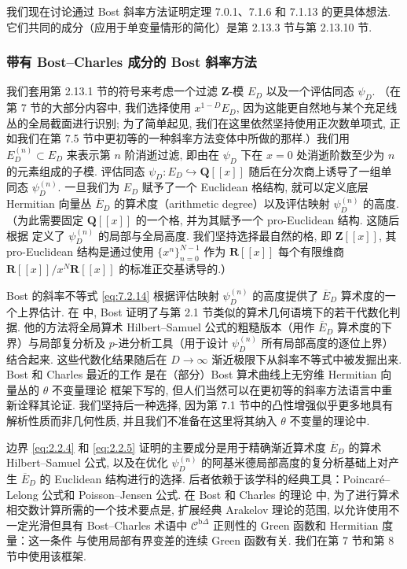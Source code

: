 我们现在讨论通过 Bost 斜率方法证明定理 7.0.1、7.1.6 和 7.1.13 的更具体想法. 它们共同的成分（应用于单变量情形的简化）是第 2.13.3 节与第 2.13.10 节.

\subsubsection{带有 Bost--Charles \cite{BC22} 成分的 Bost 斜率方法}\label{sec:2.13.12}

我们套用第 2.13.1 节的符号来考虑一个过滤 \(\mathbf{Z}\)-模 \(E_D\) 以及一个评估同态 \(\psi_D\). （在第 7 节的大部分内容中, 我们选择使用 \(x^{1-D}E_D\), 因为这能更自然地与某个充足线丛的全局截面进行识别; 为了简单起见, 我们在这里依然坚持使用正次数单项式, 正如我们在第 7.5 节中更初等的一种斜率方法变体中所做的那样.）我们用 \(E_D^{(n)} \subset E_D\) 来表示第 \(n\) 阶消逝过滤, 即由在 \(\psi_D\) 下在 \(x=0\) 处消逝阶数至少为 \(n\) 的元素组成的子模. 评估同态 \(\psi_D: E_D \hookrightarrow \mathbf{Q}[\! [x]\!]\) 随后在分次商上诱导了一组单同态 \(\psi_D^{(n)}\). 一旦我们为 \(E_D\) 赋予了一个 Euclidean 格结构, 就可以定义底层 Hermitian 向量丛 \(\overline{E}_D\) 的算术度（arithmetic degree）以及评估映射 \(\psi_D^{(n)}\) 的高度. （为此需要固定 \(\mathbf{Q}[\! [x]\!]\) 的一个格, 并为其赋予一个 pro-Euclidean 结构. 这随后根据 \cite[§ 1.4.3]{Bos20} 定义了 \(\psi_D^{(n)}\) 的局部与全局高度. 我们坚持选择最自然的格, 即 \(\mathbf{Z}[\! [x]\!]\), 其 pro-Euclidean 结构是通过使用 \(\{x^n\}_{n=0}^{N-1}\) 作为 \(\mathbf{R}[\! [x]\!]\) 每个有限维商 \(\mathbf{R}[\! [x]\!]/x^N\mathbf{R}[\! [x]\!]\) 的标准正交基诱导的.）

Bost 的斜率不等式 \eqref{eq:7.2.14} 根据评估映射 \(\psi_D^{(n)}\) 的高度提供了 \(\overline{E}_D\) 算术度的一个上界估计. 在 \cite{Bos01, Bos04} 中, Bost 证明了与第 2.1 节类似的算术几何语境下的若干代数化判据. 他的方法将全局算术 Hilbert--Samuel 公式的粗糙版本（用作 \(\overline{E}_D\) 算术度的下界）与局部复分析及 \(p\)-进分析工具（用于设计 \(\psi_D^{(n)}\) 所有局部高度的逐位上界）结合起来. 这些代数化结果随后在 \(D \to \infty\) 渐近极限下从斜率不等式中被发掘出来. Bost 和 Charles 最近的工作 \cite{BC22} 是在（部分）Bost 算术曲线上无穷维 Hermitian 向量丛的 \(\theta\) 不变量理论 \cite{Bos20} 框架下写的, 但人们当然可以在更初等的斜率方法语言中重新诠释其论证. 我们坚持后一种选择, 因为第 7.1 节中的凸性增强似乎更多地具有解析性质而非几何性质, 并且我们不准备在这里将其纳入 \(\theta\) 不变量的理论中.

边界 \eqref{eq:2.2.4} 和 \eqref{eq:2.2.5} 证明的主要成分是用于精确渐近算术度 \(\overline{E}_D\) 的算术 Hilbert--Samuel 公式, 以及在优化 \(\psi_D^{(n)}\) 的阿基米德局部高度的复分析基础上对产生 \(\overline{E}_D\) 的 Euclidean 结构进行的选择. 后者依赖于该学科的经典工具：Poincar{\'e}--Lelong 公式和 Poisson--Jensen 公式. 在 Bost 和 Charles 的理论 \cite[§ 4]{BC22} 中, 为了进行算术相交数计算所需的一个技术要点是, 扩展经典 Arakelov 理论的范围, 以允许使用不一定光滑但具有 Bost--Charles 术语中 \(\mathcal{C}^{\mathrm{b}\Delta}\) 正则性的 Green 函数和 Hermitian 度量：这一条件 \cite[Def. 4.1.1]{BC22} 与使用局部有界变差的连续 Green 函数有关. 我们在第 7 节和第 8 节中使用该框架.

